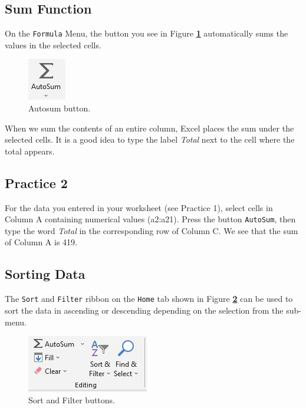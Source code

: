 \documentclass[
  12pt,
  letterpaper,
]{book}
\begin{document}
\hypertarget{sum-function}{%
\subsection{Sum Function}\label{sum-function}}

On the \texttt{Formula} Menu, the button you see in Figure \textbf{\ref{fig:autosum}} automatically sums the values in the selected cells.

\begin{figure}

{\centering \includegraphics[width=0.1\linewidth]{images/autosum} 

}

\caption{Autosum button.}\label{fig:autosum}
\end{figure}

When we sum the contents of an entire column, Excel places the sum under the selected cells. It is a good idea to type the label \emph{Total} next to the cell where the total appears.

\hypertarget{practice-2}{%
\subsection{Practice 2}\label{practice-2}}

For the data you entered in your worksheet (see Practice 1), select cells in Column A containing numerical values (a2:a21). Press the button \texttt{AutoSum}, then type the word \emph{Total} in the corresponding row of Column C. We see that the sum of Column A is 419.

\hypertarget{sorting-data}{%
\subsection{Sorting Data}\label{sorting-data}}

The \texttt{Sort} and \texttt{Filter} ribbon on the \texttt{Home} tab shown in Figure \textbf{\ref{fig:sorting}} can be used to sort the data in ascending or descending depending on the selection from the sub-menu.

\begin{figure}

{\centering \includegraphics[width=0.3\linewidth]{images/sorting} 

}

\caption{Sort and Filter buttons.}\label{fig:sorting}
\end{figure}
\end{document}
